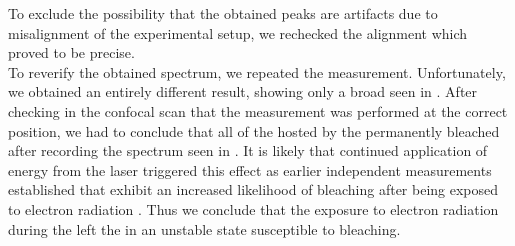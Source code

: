 				To exclude the possibility that the obtained peaks are artifacts due to misalignment of the experimental setup, we rechecked the alignment which proved to be precise.
				\\
				To reverify the obtained spectrum, we repeated the measurement. Unfortunately, we obtained an entirely different result, showing only a broad \bkg seen in . After checking in the confocal scan that the measurement was performed at the correct position, we had to conclude that all of the \sivs hosted by the \nd permanently bleached after recording the spectrum seen in . It is likely that continued application of energy from the laser triggered this effect as earlier independent measurements established that \sivs exhibit an increased likelihood of bleaching after being exposed to electron radiation \cite{}. Thus we conclude that the exposure to electron radiation during the \pp left the \sivs in an unstable state susceptible to bleaching.

